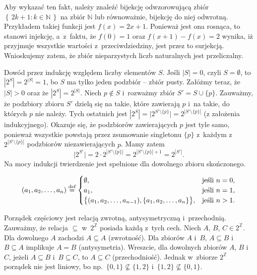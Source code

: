 \noindent Aby wykazać ten fakt, należy znaleźć bijekcję odwzorowującą zbiór $\left\{\,2k+1:k\in\mathbb{N}\,\right\}$ na zbiór $\mathbb{N}$ lub równoważnie, bijekcję do niej odwrotną. Przykładem takiej funkcji jest $f(x)=2x+1$. Ponieważ jest ona rosnąca, to stanowi injekcję, a~z~faktu, że $f(0)=1$ oraz $f(x+1)-f(x)=2$ wynika, iż przyjmuje wszystkie wartości z~przeciwdziedziny, jest przez to surjekcją. Wnioskujemy zatem, że zbiór nieparzystych liczb naturalnych jest przeliczalny.

\exercise %
Dowód przez indukcję względem liczby elementów $S$. Jeśli $|S|=0$, czyli $S=\emptyset$, to $|2^S|=2^{|S|}=1$, bo $S$ ma tylko jeden podzbiór -- zbiór pusty. Załóżmy teraz, że $|S|>0$ oraz że $|2^S|=2^{|S|}$. Niech $p\not\in S$ i~rozważmy zbiór $S'=S\cup\{p\}$. Zauważmy, że podzbiory zbioru $S'$ dzielą się na takie, które zawierają $p$ i~na takie, do których $p$ nie należy. Tych ostatnich jest $|2^S|=\bigl|2^{S'\setminus\{p\}}\bigr|=2^{\left|S'\setminus\{p\}\right|}$ (z założenia indukcyjnego). Okazuje się, że podzbiorów zawierających $p$ jest tyle samo, ponieważ wszystkie powstają przez zsumowanie singletonu $\{p\}$ z~każdym z~$2^{\left|S'\setminus\{p\}\right|}$ podzbiorów niezawierających $p$. Mamy zatem
\[
	\bigl|2^{S'}\bigr|=2\cdot2^{\left|S'\setminus\{p\}\right|} = 2^{\left|S'\setminus\{p\}\right|+1} = 2^{|S'|}.
\]
Na mocy indukcji twierdzenie jest spełnione dla dowolnego zbioru skończonego.

\exercise %
\[
	(a_1,a_2,\dots,a_n)\stackrel{\text{\scriptsize def}}{=}
	\begin{cases}
		\emptyset, & \text{jeśli $n=0$}, \\
		a_1, & \text{jeśli $n=1$}, \\
		\bigl\{(a_1,a_2,\dots,a_{n-1}),\{a_1,a_2,\dots,a_n\}\bigr\}, & \text{jeśli $n>1$}.
	\end{cases}
\]


\exercise %
Porządek częściowy jest relacją zwrotną, antysymetryczną i~przechodnią. Zauważmy, że relacja $\subseteq$ w~$2^\mathbb{Z}$ posiada każdą z~tych cech. Niech $A$, $B$, $C\in2^\mathbb{Z}$. Dla dowolnego $A$ zachodzi $A\subseteq A$ (zwrotność). Dla zbiorów $A$ i~$B$, $A\subseteq B$ i~$B\subseteq A$ implikuje $A=B$ (antysymetria). Wreszcie, dla dowolnych zbiorów $A$, $B$ i~$C$, jeżeli $A\subseteq B$ i~$B\subseteq C$, to $A\subseteq C$ (przechodniość). Jednak w~zbiorze $2^\mathbb{Z}$ porządek nie jest liniowy, bo np.\ $\{0,1\}\not\subseteq\{1,2\}$ i~$\{1,2\}\not\subseteq\{0,1\}$.

